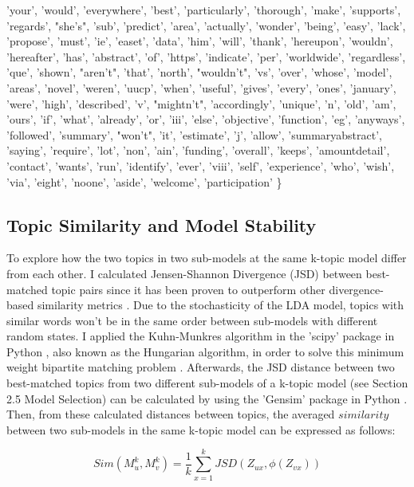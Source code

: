'your', 'would', 'everywhere', 'best', 'particularly', 'thorough', 'make', 'supports', 'regards', "she's", 'sub', 'predict', 'area', 'actually', 'wonder', 'being', 'easy', 'lack', 'propose', 'must', 'ie', 'easet', 'data', 'him', 'will', 'thank', 'hereupon', 'wouldn', 'hereafter', 'has', 'abstract', 'of', 'https', 'indicate', 'per', 'worldwide', 'regardless', 'que', 'shown', "aren't", 'that', 'north', "wouldn't", 'vs', 'over', 'whose', 'model', 'areas', 'novel', 'weren', 'uucp', 'when', 'useful', 'gives', 'every', 'ones', 'january', 'were', 'high', 'described', 'v', "mightn't", 'accordingly', 'unique', 'n', 'old', 'am', 'ours', 'if', 'what', 'already', 'or', 'iii', 'else', 'objective', 'function', 'eg', 'anyways', 'followed', 'summary', "won't", 'it', 'estimate', 'j', 'allow', 'summaryabstract', 'saying', 'require', 'lot', 'non', 'ain', 'funding', 'overall', 'keeps', 'amountdetail', 'contact', 'wants', 'run', 'identify', 'ever', 'viii', 'self', 'experience', 'who', 'wish', 'via', 'eight', 'noone', 'aside', 'welcome', 'participation' \}

\subsection*{Topic Similarity and Model Stability}

To explore how the two topics in two sub-models at the same k-topic model differ from each other. I calculated Jensen-Shannon Divergence (JSD) between best-matched topic pairs since it has been proven to outperform other divergence-based similarity metrics \cite{Kim2011}. Due to the stochasticity of the LDA model, topics with similar words won't be in the same order between sub-models with different random states. I applied the Kuhn-Munkres algorithm in the 'scipy' package in Python \cite{scipy}, also known as the Hungarian algorithm, in order to solve this minimum weight bipartite matching problem \cite{hungarian}. Afterwards, the JSD distance between two best-matched topics from two different sub-models of a k-topic model (see Section 2.5 Model Selection) can be calculated by using the 'Gensim' package in Python \cite{gensim}. Then, from these calculated distances between topics, the averaged $similarity$ between two sub-models in the same k-topic model can be expressed as follows:

\begin{equation}
  Sim(M^k_u, M^k_v) = \frac{1}{k} \sum^k_{x=1}JSD(Z_{ux}, \phi(Z_{vx}))
\end{equation}

